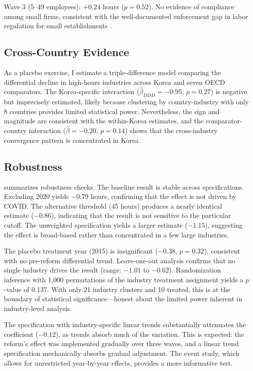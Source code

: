 \documentclass[12pt]{article}
\begin{document}
Wave 3 (5--49 employees): $+0.24$ hours ($p = 0.52$). No evidence of compliance among small firms, consistent with the well-documented enforcement gap in labor regulation for small establishments \citep{hamermesh2014}.

\subsection{Cross-Country Evidence}

As a placebo exercise, I estimate a triple-difference model comparing the differential decline in high-hours industries across Korea and seven OECD comparators. The Korea-specific interaction ($\hat{\beta}_{DDD} = -0.95$, $p = 0.27$) is negative but imprecisely estimated, likely because clustering by country-industry with only 8 countries provides limited statistical power. Nevertheless, the sign and magnitude are consistent with the within-Korea estimates, and the comparator-country interaction ($\hat{\beta} = -0.20$, $p = 0.14$) shows that the cross-industry convergence pattern is concentrated in Korea.

\subsection{Robustness}

 summarizes robustness checks. The baseline result is stable across specifications. Excluding 2020 yields $-0.79$ hours, confirming that the effect is not driven by COVID. The alternative threshold (45 hours) produces a nearly identical estimate ($-0.86$), indicating that the result is not sensitive to the particular cutoff. The unweighted specification yields a larger estimate ($-1.15$), suggesting the effect is broad-based rather than concentrated in a few large industries.

The placebo treatment year (2015) is insignificant ($-0.38$, $p = 0.32$), consistent with no pre-reform differential trend. Leave-one-out analysis confirms that no single industry drives the result (range: $-1.01$ to $-0.62$). Randomization inference with 1,000 permutations of the industry treatment assignment yields a $p$-value of 0.137. With only 21 industry clusters and 10 treated, this is at the boundary of statistical significance---honest about the limited power inherent in industry-level analysis.

The specification with industry-specific linear trends substantially attenuates the coefficient ($-0.12$), as trends absorb much of the variation. This is expected: the reform's effect was implemented gradually over three waves, and a linear trend specification mechanically absorbs gradual adjustment. The event study, which allows for unrestricted year-by-year effects, provides a more informative test.
\end{document}
